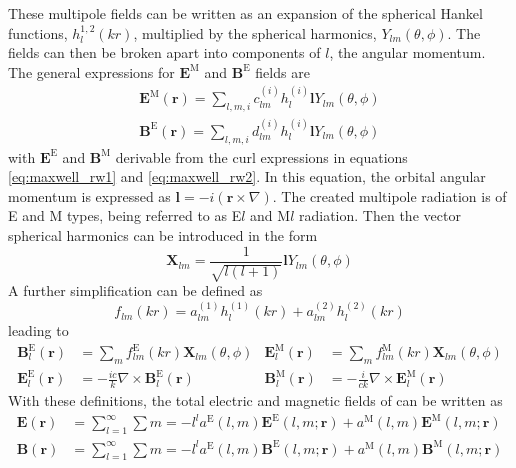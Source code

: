 These multipole fields can be written as an expansion of the spherical Hankel functions, $h_l^{1,2}(kr)$, multiplied by the spherical harmonics, $Y_{lm}(\theta,\phi)$. The fields can then be broken apart into components of $l$, the angular momentum.  The general expressions for $\textbf{E}^\text{M}$ and $\textbf{B}^\text{E}$ fields are
\begin{subequations}
\begin{align}
    \textbf{E}^\text{M}(\textbf{r})=\sum_{l,m,i}c_{lm}^{(i)}h_l^{(i)}\textbf{l}Y_{lm}(\theta,\phi) \\
    \textbf{B}^\text{E}(\textbf{r})=\sum_{l,m,i}d_{lm}^{(i)}h_l^{(i)}\textbf{l}Y_{lm}(\theta,\phi)
\end{align}
\end{subequations}
with $\textbf{E}^\text{E}$ and $\textbf{B}^\text{M}$ derivable from the curl expressions in equations \ref{eq:maxwell_rw1} and \ref{eq:maxwell_rw2}. In this equation, the orbital angular momentum is expressed as $\textbf{l}=-i(\textbf{r}\times\nabla)$. The created multipole radiation is of E and M types, being referred to as E$l$ and M$l$ radiation. Then the vector spherical harmonics can be introduced in the form
\begin{equation}
    \textbf{X}_{lm}=\frac{1}{\sqrt{l(l+1)}}\textbf{l}Y_{lm}(\theta,\phi)
\end{equation}
A further simplification can be defined as
\begin{equation}
    f_{lm}(kr)=a_{lm}^{(1)}h_l^{(1)}(kr)+a_{lm}^{(2)}h_l^{(2)}(kr)
\end{equation}
leading to
\begin{subequations}
\begin{align}
    \textbf{B}_l^\text{E}(\textbf{r}) & = \sum_m f_{lm}^{\text{E}}(kr)\textbf{X}_{lm}(\theta,\phi) & \textbf{E}_l^\text{M}(\textbf{r}) & = \sum_m f_{lm}^{\text{M}}(kr)\textbf{X}_{lm}(\theta,\phi)\\
    \textbf{E}_l^\text{E}(\textbf{r}) & = -\frac{ic}{k}\nabla\times \textbf{B}_l^\text{E}(\textbf{r}) & \textbf{B}_l^\text{M}(\textbf{r}) & = -\frac{i}{ck}\nabla\times \textbf{E}_l^\text{M}(\textbf{r})
\end{align}
\end{subequations}
With these definitions, the total electric and magnetic fields of can be written as
\begin{subequations}
\begin{align}
    \textbf{E}(\textbf{r}) & = \sum_{l=1}^{\infty}\sum{m=-l}^{l} a^\text{E}(l,m)\textbf{E}^\text{E}(l,m;\textbf{r})+ a^\text{M}(l,m)\textbf{E}^\text{M}(l,m;\textbf{r}) \\
    \textbf{B}(\textbf{r}) & = \sum_{l=1}^{\infty}\sum{m=-l}^{l} a^\text{E}(l,m)\textbf{B}^\text{E}(l,m;\textbf{r})+ a^\text{M}(l,m)\textbf{B}^\text{M}(l,m;\textbf{r}) 
\end{align}
\end{subequations}
